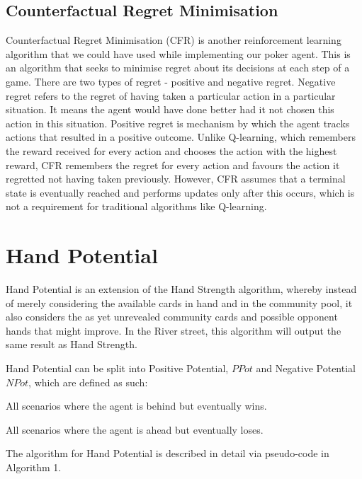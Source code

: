 \documentclass{article}
\begin{document}
\subsection{Counterfactual Regret Minimisation}

Counterfactual Regret Minimisation (CFR) is another reinforcement learning algorithm that we could have used while implementing our poker agent. This is an algorithm that seeks to minimise regret about its decisions at each step of a game. There are two types of regret - positive and negative regret. Negative regret refers to the regret of having taken a particular action in a particular situation. It means the agent would have done better had it not chosen this action in this situation. Positive regret is mechanism by which the agent tracks actions that resulted in a positive outcome. Unlike Q-learning, which remembers the reward received for every action and chooses the action with the highest reward, CFR remembers the regret for every action and favours the action it regretted not having taken previously. However, CFR assumes that a terminal state is eventually reached and performs updates only after this occurs, which is not a requirement for traditional algorithms like Q-learning.

\iffalse
\section{Hand Potential}

Hand Potential is an extension of the Hand Strength algorithm, whereby instead of merely considering the available cards in hand and in the community pool, it also considers the as yet unrevealed community cards and possible opponent hands that might improve. In the River street, this algorithm will output the same result as Hand Strength.

Hand Potential can be split into Positive Potential, $PPot$ and Negative Potential $NPot$, which are defined as such:
\begin{description}[style=multiline,leftmargin=10mm]
\item [\emph{PPot}]All scenarios where the agent is behind but eventually wins.
\item [\emph{NPot}]All scenarios where the agent is ahead but eventually loses.
\end{description}

The algorithm for Hand Potential is described in detail via pseudo-code in Algorithm 1.
\end{document}
